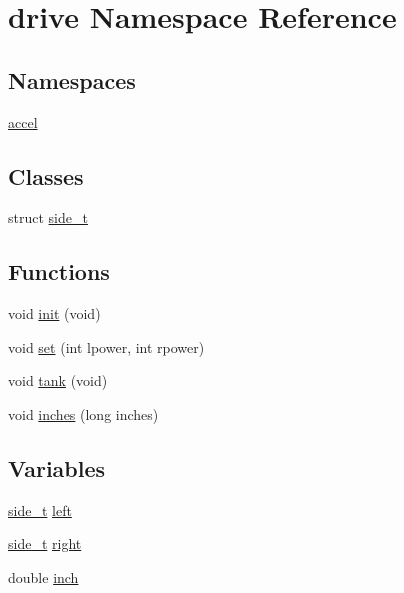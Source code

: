 \hypertarget{namespacedrive}{}\section{drive Namespace Reference}
\label{namespacedrive}
\subsection*{Namespaces}
\begin{DoxyCompactItemize}
\item 
 \hyperlink{namespacedrive_1_1accel}{accel}
\end{DoxyCompactItemize}
\subsection*{Classes}
\begin{DoxyCompactItemize}
\item 
struct \hyperlink{structdrive_1_1side__t}{side\+\_\+t}
\end{DoxyCompactItemize}
\subsection*{Functions}
\begin{DoxyCompactItemize}
\item 
void \hyperlink{namespacedrive_afb11be06c88e18373ad210a65e146d53}{init} (void)
\item 
void \hyperlink{namespacedrive_a2df65772c3853804f68f3358b04420b2}{set} (int lpower, int rpower)
\item 
void \hyperlink{namespacedrive_a4468fd8982ce72051c07b37cf1f91185}{tank} (void)
\item 
void \hyperlink{namespacedrive_ab1c99e0f944b404b036034bac0074ca6}{inches} (long inches)
\end{DoxyCompactItemize}
\subsection*{Variables}
\begin{DoxyCompactItemize}
\item 
\hyperlink{structdrive_1_1side__t}{side\+\_\+t} \hyperlink{namespacedrive_abde1df4410c0d0bfc462f3fb33ab9c5d}{left}
\item 
\hyperlink{structdrive_1_1side__t}{side\+\_\+t} \hyperlink{namespacedrive_a6adcb98f34f373f5e1fae1c46b8d7269}{right}
\item 
double \hyperlink{namespacedrive_ac57641567511fcbc0ce6bf72b1aff76e}{inch}
\end{DoxyCompactItemize}


